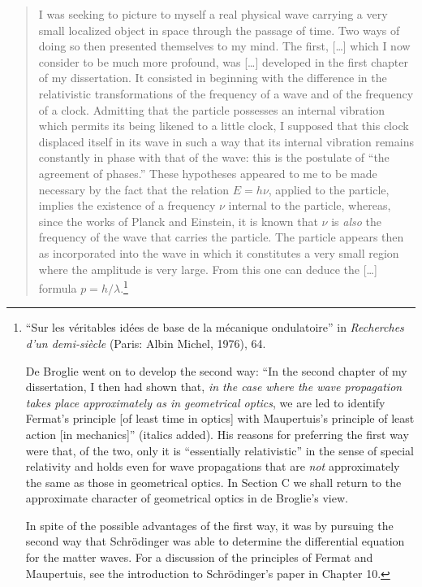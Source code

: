 \begin{quotation}
I was seeking to picture to myself a real physical wave carrying a very
small localized object in space through the passage of time. Two ways of
doing so then presented themselves to my mind. The first, [\ldots] which I
now consider to be much more profound, was [\ldots] developed in the first
chapter of my dissertation. It consisted in beginning with the
difference in the relativistic transformations of the frequency of a
wave and of the frequency of a clock. Admitting that the particle
possesses an internal vibration which permits its being likened to a
little clock, I supposed that this clock displaced itself in its wave in
such a way that its internal vibration remains constantly in phase with
that of the wave: this is the postulate of ``the agreement of phases.''
These hypotheses appeared to me to be made necessary by the fact that
the relation $E = h\nu$, applied to the particle, implies the
existence of a frequency $\nu$ internal to the particle, whereas,
since the works of Planck and Einstein, it is known that $\nu$ is
\emph{also} the frequency of the wave that carries the particle. The
particle appears then as incorporated into the wave in which it
constitutes a very small region where the amplitude is very large. From
this one can deduce the [\ldots] formula $p =h/\lambda$.\footnote{``Sur 
  les véritables idées de base de la
  mécanique ondulatoire'' in \emph{Recherches d'un demi-siècle} (Paris:
  Albin Michel, 1976), 64.

  De Broglie went on to develop the second way: ``In the second chapter
  of my dissertation, I then had shown that, \emph{in the case where the
  wave propagation takes place approximately as in geometrical optics},
  we are led to identify Fermat's principle {[}of least time in
  optics{]} with Maupertuis's principle of least action {[}in
  mechanics{]}'' (italics added). His reasons for preferring the first
  way were that, of the two, only it is ``essentially relativistic'' in
  the sense of special relativity and holds even for wave propagations
  that are \emph{not} approximately the same as those in geometrical
  optics. In Section C we shall return to the approximate character of
  geometrical optics in de Broglie's view.

  In spite of the possible advantages of the first way, it was by
  pursuing the second way that Schrödinger was able to determine the
  differential equation for the matter waves. For a discussion of the
  principles of Fermat and Maupertuis, see the introduction to
  Schrödinger's paper in Chapter 10.}
\end{quotation}

